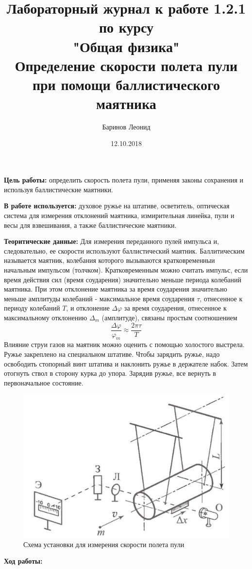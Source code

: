 \documentclass[a4paper,12pt]{article} %
\title{Лабораторный журнал к работе 1.2.1 по курсу \\ "Общая физика"  \\ 
\vspace{0.2cm}
\vspace{4.5cm}
 \LARGE{\textbf{Определение скорости полета пули при помощи баллистического маятника}}\vspace{5.5cm}}
\date{12.10.2018}
\author{\vspace{0.2cm}Баринов Леонид}
\begin{document}
\maketitle
\newpage

\textbf{Цель работы:} определить скорость полета пули, применяя законы сохранения и используя баллистические маятники.

\textbf{В работе используется:} духовое ружье на штативе, осветитель, оптическая система для измерения отклонений маятника, измирительная линейка, пули и весы для взвешивания, а также баллистические маятники.

\textbf{Теоритические данные:}
Для измерения переданного пулей импульса и, следовательно, ее скорости используют баллистический маятник. Баллитическим называется маятник, колебания которого вызываются кратковременныи начальным импульсом (толчком). Кратковременным можно считать импульс, если время действия сил (время соударения) значительно меньше периода колебаний маятника. При этом отклонение маятника за время соударения значительно меньше амплитуды колебаний - максимальное время соударения $\tau$, отнесенное к периоду колебаний $T$, и отклонение $\Delta\varphi$ за время соударения, отнесенное к максимальному отклонению $\Delta_m$ (амплитуде), связаны простым соотношением
\[\frac{\Delta\varphi}{\varphi_m}\approx\frac{2\pi\tau}{T}\]
Влияние струи газов на маятник можно оценить с помощью холостого выстрела. Ружье закреплено на специальном штативе. Чтобы зарядить ружье, надо освободить стопорный винт штатива и наклонить ружье в держателе набок. Затем отогнуть ствол в сторону курка до упора. Зарядив ружье, все вернуть в первоначальное состояние.
\begin{figure}[h]
\centering
\includegraphics[scale = 0.4]{1}
\caption{Схема установки для измерения скорости полета пули}
\end{figure}
\newpage
\textbf{Ход работы:}
\end{document}

